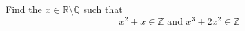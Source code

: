 Find the $x\in \mathbb{R}\setminus \mathbb{Q}$ such that \[ x^2+x\in \mathbb{Z}\text{ and }x^3+2x^2\in\mathbb{Z} \]